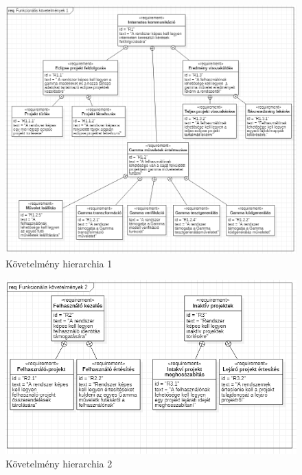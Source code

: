\begin{figure}[!ht]
	\includegraphics[width=170mm, keepaspectratio]{figures/requierments_placeholder.png}
	\caption{Követelmény hierarchia 1}
	\label{fig:requierments_placeholder}
\end{figure}

\begin{figure}[!ht]
	\includegraphics[width=150mm, keepaspectratio]{figures/requierments_2.png}
	\caption{Követelmény hierarchia 2}
	\label{fig:requierements_2}
\end{figure}

